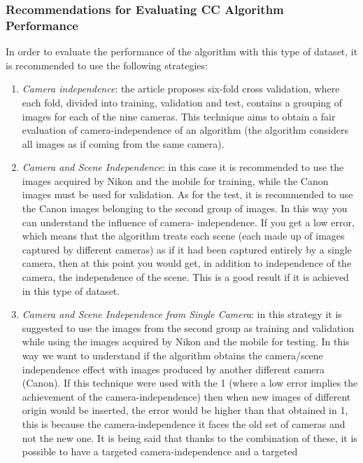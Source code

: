 \subsubsection{Recommendations for Evaluating CC Algorithm Performance}\label{recommend}
In order to evaluate the performance of the algorithm with this type of 
dataset, it is recommended to use the following strategies:
\begin{enumerate}
    \item \emph{Camera independence}: the article proposes six-fold cross validation, 
    where each fold, divided into training, validation and test, contains a 
    grouping of images for each of the nine cameras. This technique aims 
    to obtain a fair evaluation of camera-independence of an algorithm (the 
    algorithm considers all images as if coming from the same camera).
    \item \emph{Camera and Scene Independence}: in this case it is recommended to 
    use the images acquired by Nikon and the mobile for training, while 
    the Canon images must be used for validation. As for the test, it is 
    recommended to use the Canon images belonging to the second group 
    of images. In this way you can understand the influence of camera-
    independence. If you get a low error, which means that the algorithm 
    treats each scene (each made up of images captured by different cameras) 
    as if it had been captured entirely by a single camera, then at 
    this point you would get, in addition to independence of the camera, 
    the independence of the scene. This is a good result if it is achieved in 
    this type of dataset.
    \item \emph{Camera and Scene Independence from Single Camera}: in this strategy 
    it is suggested to use the images from the second group as training 
    and validation while using the images acquired by Nikon and the 
    mobile for testing. In this way we want to understand if the algorithm 
    obtains the camera/scene independence effect with images produced 
    by another different camera (Canon). If this technique were 
    used with the 1 (where a low error implies the achievement of the 
    camera-independence) then when new images of different origin would 
    be inserted, the error would be higher than that obtained in 1, this is 
    because the camera-independence it faces the old set of cameras and not 
    the new one. It is being said that thanks to the combination of these, 
    it is possible to have a targeted camera-independence and a targeted 

\end{enumerate}

